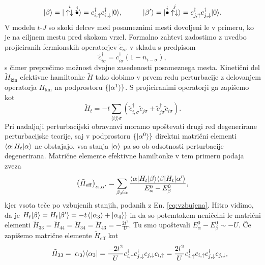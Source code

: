 \begin{appendices}
\begin{equation}
\ket{\beta}=\ket{ \overset{i}{\uparrow\downarrow}\overset{j}{\bullet}}=c^\dagger_{i,\uparrow}c^\dagger_{i,\downarrow}\ket{0}, \hspace{10mm} 
\ket{\beta'}=\ket{\overset{i}{\bullet}\overset{j}{\uparrow\downarrow}}=c^\dagger_{j,\uparrow}c^\dagger_{j,\downarrow}\ket{0}.
\end{equation}
 V modelu $t$-$J$ so skoki delcev med posameznimi mesti dovoljeni le v primeru, ko je na ciljnem mestu pred skokom vrzel. Formalno zahtevi zadostimo z uvedbo projiciranih fermionskih operatorjev $\tilde{c}_{i\sigma}$ v skladu s predpisom 
\begin{equation}\label{eq:projicirani}
\tilde{c}^\dagger_{i\sigma}= c^\dagger_{i\sigma} \left(1-n_{i-\sigma}\right),
\end{equation}
s čimer preprečimo možnost dvojne zasedenosti posameznega mesta. Kinetični del $\tilde{H}_\mathrm{kin}$ efektivne hamiltonke $\tilde{H}$ tako dobimo v prvem redu perturbacije z delovanjem operatorja $H_\mathrm{kin}$ na podprostoru $\{ \vert\alpha^1\rangle \}$. S projiciranimi operatorji ga zapišemo kot 
\begin{equation}\label{eq:ef_kin}
\tilde{H}_t=-t\sum\limits_{\langle ij \rangle \sigma} \left(\tilde{c}^\dagger_{i,\sigma} \tilde{c}_{j\sigma} + \tilde{c}^\dagger_{j\sigma}\tilde{c}_{i\sigma}\right).
\end{equation}
Pri nadaljnji perturbacijski obravnavi moramo upoštevati drugi red degenerirane perturbacijske teorije, saj v podprostoru $\{ \vert\alpha^0\rangle\}$ direktni matrični elementi $\langle \alpha \vert H_t \vert\alpha\rangle$ ne obstajajo, vsa stanja $\vert\alpha\rangle$ pa so ob odsotnosti perturbacije degenerirana. 
Matrične elemente efektivne hamiltonke v tem primeru podaja zveza 
\begin{equation}
\left(\tilde{H}_\mathrm{eff}\right)_{\alpha, \alpha'}=\sum\limits_{\beta\neq\alpha}\frac{\langle \alpha \vert H_t\vert\beta\rangle\langle \beta \vert H_t\vert\alpha'\rangle}{E_\alpha^0 - E_\beta^0},
\end{equation}
kjer vsota teče po vzbujenih stanjih, podanih z En. \eqref{eq:vzbujena}. Hitro vidimo, da je 
$H_t\vert\beta\rangle=H_t\vert\beta'\rangle=-t\left(\vert\alpha_3\rangle+ \vert\alpha_4\rangle\right)$ in da so potemtakem neničelni le matrični elementi $\tilde{H}_{33}=\tilde{H}_{44}=\tilde{H}_{34}=\tilde{H}_{43}=-\frac{2t^2}{U}$. Tu smo upoštevali $E_\alpha^0- E_\beta^0 \sim -U$. Če zapišemo matrične elemente $\tilde{H}_\mathrm{eff}$ kot
\begin{equation}
\begin{aligned}\qquad
&\tilde{H}_{33}=\ket{\alpha_3}\bra{\alpha_3}=\frac{-2t^2}{U} c^\dagger_{i,\uparrow}c^\dagger_{j,\downarrow}c_{j,\downarrow}c_{i,\uparrow}= \frac{2t^2}{U}c^\dagger_{i,\uparrow}c_{i,\uparrow}c^\dagger_{j,\downarrow}c_{j,\downarrow},\\

\end{aligned}
\end{equation}
\end{appendices}
